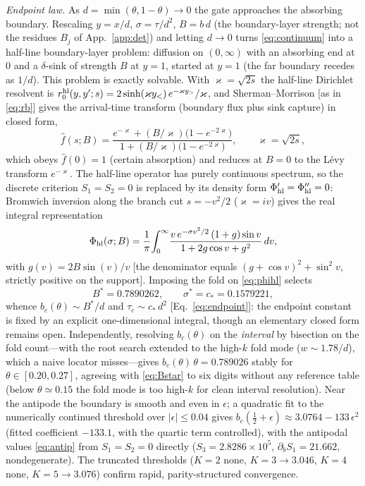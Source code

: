 \documentclass[reprint,amsmath,amssymb,aps,prresearch,longbibliography]{revtex4-2}
\begin{document}
\emph{Endpoint law.} As $d=\min(\theta,1-\theta)\to0$ the gate approaches the absorbing boundary.
Rescaling $y=x/d$, $\sigma=\tau/d^2$, $B=b\,d$ (the boundary-layer strength; not the residues $B_j$ of
App.~\ref{app:det}) and letting $d\to0$ turns \eqref{eq:continuum} into a half-line boundary-layer
problem: diffusion on $(0,\infty)$ with an absorbing end at $0$ and a $\delta$-sink of strength $B$ at
$y=1$, started at $y=1$ (the far boundary recedes as $1/d$). This problem is exactly solvable. With
$\varkappa=\sqrt{2s}$ the half-line Dirichlet resolvent is
$r_0^{\rm hl}(y,y';s)=2\sinh(\varkappa y_<)\,e^{-\varkappa y_>}/\varkappa$, and Sherman--Morrison [as
in \eqref{eq:rb}] gives the arrival-time transform (boundary flux plus sink capture) in closed form,
\begin{equation}
\hat f(s;B)=\frac{e^{-\varkappa}+(B/\varkappa)\big(1-e^{-2\varkappa}\big)}
{1+(B/\varkappa)\big(1-e^{-2\varkappa}\big)},\qquad \varkappa=\sqrt{2s},
\label{eq:fhl}
\end{equation}
which obeys $\hat f(0)=1$ (certain absorption) and reduces at $B=0$ to the L\'evy transform
$e^{-\varkappa}$. The half-line operator has purely continuous spectrum, so the discrete criterion
$S_1=S_2=0$ is replaced by its density form $\Phi_{\rm hl}'=\Phi_{\rm hl}''=0$: Bromwich inversion
along the branch cut $s=-v^2/2$ ($\varkappa=iv$) gives the real integral representation
\begin{equation}
\Phi_{\rm hl}(\sigma;B)=\frac1\pi\!\int_0^\infty\!\frac{v\,e^{-\sigma v^2/2}\,(1+g)\sin v}
{1+2g\cos v+g^2}\,dv,
\label{eq:phihl}
\end{equation}
with $g(v)=2B\sin(v)/v$ [the denominator equals $(g+\cos v)^2+\sin^2v$, strictly positive on the
support]. Imposing the fold on \eqref{eq:phihl} selects
\begin{equation}
B^*=0.7890262,\qquad \sigma^*=c_*=0.1579221,
\label{eq:Bstar}
\end{equation}
whence $b_c(\theta)\sim B^*/d$ and $\tau_c\sim c_*\,d^2$ [Eq.~\eqref{eq:endpoint}]: the endpoint
constant is fixed by an explicit one-dimensional integral, though an elementary closed form remains
open. Independently, resolving $b_c(\theta)$ on the \emph{interval} by bisection on the fold
count---with the root search extended to the high-$k$ fold mode ($w\sim1.78/d$), which a naive
locator misses---gives $b_c(\theta)\,\theta=0.789026$ stably for $\theta\in[0.20,0.27]$, agreeing
with \eqref{eq:Bstar} to six digits without any reference table (below $\theta\simeq0.15$ the fold
mode is too high-$k$ for clean interval resolution). Near the
antipode the boundary is smooth and even in $\epsilon$; a quadratic fit to the numerically continued
threshold over $|\epsilon|\le0.04$ gives
$b_c(\tfrac12+\epsilon)\approx3.0764-133\,\epsilon^2$ (fitted coefficient $-133.1$, with the quartic
term controlled), with the antipodal values \eqref{eq:antip} from
$S_1=S_2=0$ directly ($S_3=2.8286\times10^5$, $\partial_bS_1=21.662$, nondegenerate). The truncated
thresholds ($K=2$ none, $K=3\to3.046$, $K=4$ none, $K=5\to3.076$) confirm rapid, parity-structured
convergence.
\end{document}
